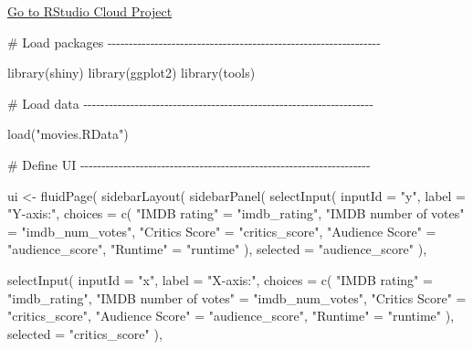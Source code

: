 \documentclass[
  letterpaper,
  DIV=11,
  numbers=noendperiod]{scrreprt}
\newenvironment{Shaded}{\begin{snugshade}}{\end{snugshade}}
\newcommand{\AttributeTok}[1]{\textcolor[rgb]{0.40,0.46,0.14}{#1}}
\newcommand{\CommentTok}[1]{\textcolor[rgb]{0.37,0.37,0.37}{#1}}
\newcommand{\FunctionTok}[1]{\textcolor[rgb]{0.28,0.35,0.67}{#1}}
\newcommand{\NormalTok}[1]{\textcolor[rgb]{0.00,0.46,0.62}{#1}}
\newcommand{\OtherTok}[1]{\textcolor[rgb]{0.00,0.46,0.62}{#1}}
\newcommand{\StringTok}[1]{\textcolor[rgb]{0.13,0.47,0.30}{#1}}
\begin{document}
\href{https://rstudio.cloud/spaces/81721/join?access_code=I4VJaNsKfTqR3Td9hLP7E1nz8\%2FtMg6Xbw9Bgqumv}{
Go to RStudio Cloud Project}

\begin{Shaded}
\begin{Highlighting}[]
\CommentTok{\# Load packages {-}{-}{-}{-}{-}{-}{-}{-}{-}{-}{-}{-}{-}{-}{-}{-}{-}{-}{-}{-}{-}{-}{-}{-}{-}{-}{-}{-}{-}{-}{-}{-}{-}{-}{-}{-}{-}{-}{-}{-}{-}{-}{-}{-}{-}{-}{-}{-}{-}{-}{-}{-}{-}{-}{-}{-}{-}{-}{-}{-}{-}{-}{-}{-}}

\FunctionTok{library}\NormalTok{(shiny)}
\FunctionTok{library}\NormalTok{(ggplot2)}
\FunctionTok{library}\NormalTok{(tools)}

\CommentTok{\# Load data {-}{-}{-}{-}{-}{-}{-}{-}{-}{-}{-}{-}{-}{-}{-}{-}{-}{-}{-}{-}{-}{-}{-}{-}{-}{-}{-}{-}{-}{-}{-}{-}{-}{-}{-}{-}{-}{-}{-}{-}{-}{-}{-}{-}{-}{-}{-}{-}{-}{-}{-}{-}{-}{-}{-}{-}{-}{-}{-}{-}{-}{-}{-}{-}{-}{-}{-}{-}}

\FunctionTok{load}\NormalTok{(}\StringTok{"movies.RData"}\NormalTok{)}

\CommentTok{\# Define UI {-}{-}{-}{-}{-}{-}{-}{-}{-}{-}{-}{-}{-}{-}{-}{-}{-}{-}{-}{-}{-}{-}{-}{-}{-}{-}{-}{-}{-}{-}{-}{-}{-}{-}{-}{-}{-}{-}{-}{-}{-}{-}{-}{-}{-}{-}{-}{-}{-}{-}{-}{-}{-}{-}{-}{-}{-}{-}{-}{-}{-}{-}{-}{-}{-}{-}{-}{-}}

\NormalTok{ui }\OtherTok{\textless{}{-}} \FunctionTok{fluidPage}\NormalTok{(}
  \FunctionTok{sidebarLayout}\NormalTok{(}
    \FunctionTok{sidebarPanel}\NormalTok{(}
      \FunctionTok{selectInput}\NormalTok{(}
        \AttributeTok{inputId =} \StringTok{"y"}\NormalTok{,}
        \AttributeTok{label =} \StringTok{"Y{-}axis:"}\NormalTok{,}
        \AttributeTok{choices =} \FunctionTok{c}\NormalTok{(}
          \StringTok{"IMDB rating"} \OtherTok{=} \StringTok{"imdb\_rating"}\NormalTok{,}
          \StringTok{"IMDB number of votes"} \OtherTok{=} \StringTok{"imdb\_num\_votes"}\NormalTok{,}
          \StringTok{"Critics Score"} \OtherTok{=} \StringTok{"critics\_score"}\NormalTok{,}
          \StringTok{"Audience Score"} \OtherTok{=} \StringTok{"audience\_score"}\NormalTok{,}
          \StringTok{"Runtime"} \OtherTok{=} \StringTok{"runtime"}
\NormalTok{        ),}
        \AttributeTok{selected =} \StringTok{"audience\_score"}
\NormalTok{      ),}

      \FunctionTok{selectInput}\NormalTok{(}
        \AttributeTok{inputId =} \StringTok{"x"}\NormalTok{,}
        \AttributeTok{label =} \StringTok{"X{-}axis:"}\NormalTok{,}
        \AttributeTok{choices =} \FunctionTok{c}\NormalTok{(}
          \StringTok{"IMDB rating"} \OtherTok{=} \StringTok{"imdb\_rating"}\NormalTok{,}
          \StringTok{"IMDB number of votes"} \OtherTok{=} \StringTok{"imdb\_num\_votes"}\NormalTok{,}
          \StringTok{"Critics Score"} \OtherTok{=} \StringTok{"critics\_score"}\NormalTok{,}
          \StringTok{"Audience Score"} \OtherTok{=} \StringTok{"audience\_score"}\NormalTok{,}
          \StringTok{"Runtime"} \OtherTok{=} \StringTok{"runtime"}
\NormalTok{        ),}
        \AttributeTok{selected =} \StringTok{"critics\_score"}
\NormalTok{      ),}


\end{Highlighting}
\end{Shaded}
\end{document}
